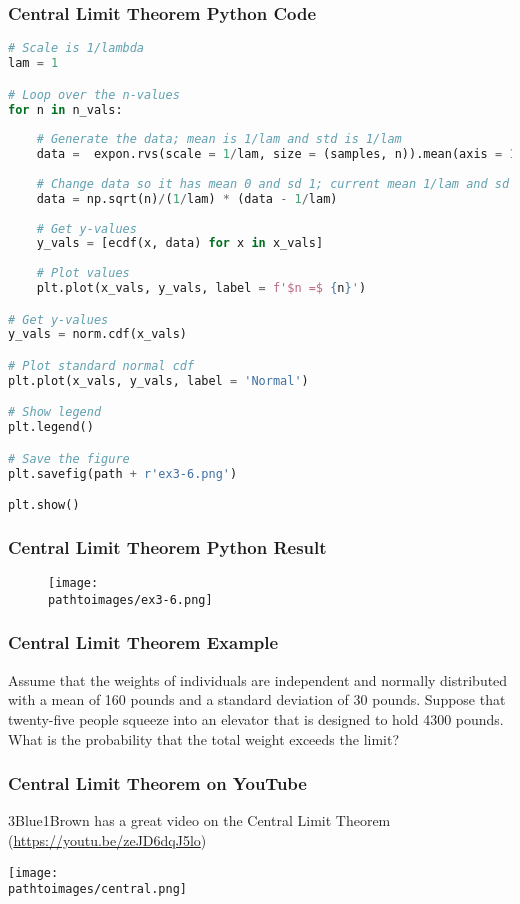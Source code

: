 \documentclass{beamer}
\newcommand{\pathtoimages}{/Users/charlesrambo/Desktop/Bootcamp24/Images}
\begin{document}
\begin{frame}[fragile]
\frametitle{Central Limit Theorem Python Code}
\begin{lstlisting}[language=Python]
# Scale is 1/lambda
lam = 1

# Loop over the n-values
for n in n_vals:
    
    # Generate the data; mean is 1/lam and std is 1/lam
    data =  expon.rvs(scale = 1/lam, size = (samples, n)).mean(axis = 1)
    
    # Change data so it has mean 0 and sd 1; current mean 1/lam and sd 1/(lam * sqrt(n))
    data = np.sqrt(n)/(1/lam) * (data - 1/lam)
    
    # Get y-values
    y_vals = [ecdf(x, data) for x in x_vals]
    
    # Plot values
    plt.plot(x_vals, y_vals, label = f'$n =$ {n}')

# Get y-values
y_vals = norm.cdf(x_vals)

# Plot standard normal cdf
plt.plot(x_vals, y_vals, label = 'Normal')

# Show legend
plt.legend()

# Save the figure
plt.savefig(path + r'ex3-6.png')

plt.show()\end{lstlisting}

\end{frame}

\begin{frame}
\frametitle{Central Limit Theorem Python Result}
\begin{figure}
\centering
\texttt{[image: \\pathtoimages/ex3-6.png]}
\end{figure}

\end{frame}

\begin{frame}[t]
\frametitle{Central Limit Theorem Example}
\tiny
\begin{Example}
Assume that the weights of individuals are independent and normally distributed with a mean of 160 pounds and a standard deviation of 30 pounds. Suppose that twenty-five people squeeze into an elevator that is designed to hold 4300 pounds. What is the probability that the total weight exceeds the limit?
\end{Example}
\end{frame}

\begin{frame}
\frametitle{Central Limit Theorem on YouTube}
\small
3Blue1Brown has a great video on the Central Limit Theorem (\url{https://youtu.be/zeJD6dqJ5lo})
\begin{center}
\texttt{[image: \\pathtoimages/central.png]}
\end{center}
\end{frame}
\end{document}
